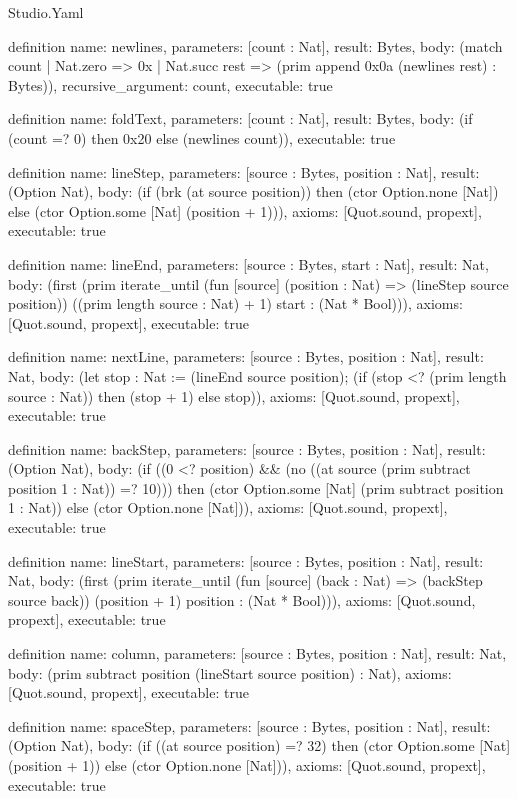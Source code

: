 \begin{lexlean}{Studio.Yaml}
\begin{semanticmodule}
definition{
  name: newlines,
  parameters: [count : Nat],
  result: Bytes,
  body: (match count
    | Nat.zero => 0x
    | Nat.succ rest => (prim append 0x0a (newlines rest) : Bytes)),
  recursive_argument: count,
  executable: true
}

definition{
  name: foldText,
  parameters: [count : Nat],
  result: Bytes,
  body: (if (count =? 0) then 0x20 else (newlines count)),
  executable: true
}

definition{
  name: lineStep,
  parameters: [source : Bytes, position : Nat],
  result: (Option Nat),
  body: (if (brk (at source position)) then (ctor Option.none [Nat]) else (ctor Option.some [Nat] (position + 1))),
  axioms: [Quot.sound, propext],
  executable: true
}

definition{
  name: lineEnd,
  parameters: [source : Bytes, start : Nat],
  result: Nat,
  body: (first (prim iterate_until (fun [source] (position : Nat) => (lineStep source position)) ((prim length source : Nat) + 1) start : (Nat * Bool))),
  axioms: [Quot.sound, propext],
  executable: true
}

definition{
  name: nextLine,
  parameters: [source : Bytes, position : Nat],
  result: Nat,
  body: (let stop : Nat := (lineEnd source position); (if (stop <? (prim length source : Nat)) then (stop + 1) else stop)),
  axioms: [Quot.sound, propext],
  executable: true
}

definition{
  name: backStep,
  parameters: [source : Bytes, position : Nat],
  result: (Option Nat),
  body: (if ((0 <? position) && (no ((at source (prim subtract position 1 : Nat)) =? 10))) then (ctor Option.some [Nat] (prim subtract position 1 : Nat)) else (ctor Option.none [Nat])),
  axioms: [Quot.sound, propext],
  executable: true
}

definition{
  name: lineStart,
  parameters: [source : Bytes, position : Nat],
  result: Nat,
  body: (first (prim iterate_until (fun [source] (back : Nat) => (backStep source back)) (position + 1) position : (Nat * Bool))),
  axioms: [Quot.sound, propext],
  executable: true
}

definition{
  name: column,
  parameters: [source : Bytes, position : Nat],
  result: Nat,
  body: (prim subtract position (lineStart source position) : Nat),
  axioms: [Quot.sound, propext],
  executable: true
}

definition{
  name: spaceStep,
  parameters: [source : Bytes, position : Nat],
  result: (Option Nat),
  body: (if ((at source position) =? 32) then (ctor Option.some [Nat] (position + 1)) else (ctor Option.none [Nat])),
  axioms: [Quot.sound, propext],
  executable: true
}


\end{semanticmodule}
\end{lexlean}
